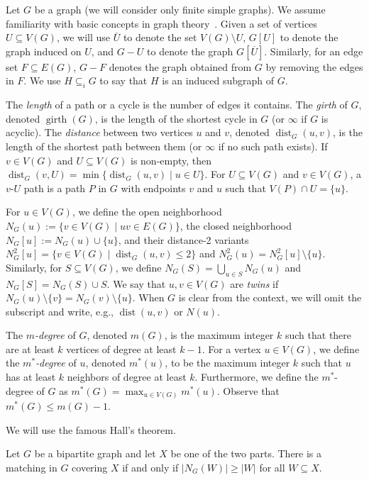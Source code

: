 \documentclass[runningheads, envcountsame]{llncs}
\newcommand{\sep}{\;|\;}
\newcommand{\seq}{\subseteq}
\DeclareMathOperator{\dist}{dist}
\DeclareMathOperator{\girth}{girth}
\begin{document}
Let $G$ be a graph (we will consider only finite simple graphs).
We assume familiarity with basic concepts in graph theory~\cite{Diestel}.
Given a set of vertices $U\seq V(G)$, we will use $\overline{U}$ to denote the set $V(G) \setminus U$, $G[U]$ to denote the graph induced on $U$, and $G - U$ to denote the graph $G[\overline{U}]$.
Similarly, for an edge set $F \seq E(G)$, $G-F$ denotes the graph obtained from $G$ by removing the edges in $F$.
We use $H \seq_i G$ to say that $H$ is an induced subgraph of $G$.

The \emph{length} of a path or a cycle is the number of edges it contains.
The \emph{girth} of $G$, denoted $\girth(G)$, is the length of the shortest cycle in $G$ (or $\infty$ if $G$ is acyclic).
The \emph{distance} between two vertices $u$ and $v$, denoted $\dist_G(u, v)$,
is the length of the shortest path between them (or $\infty$ if no such path exists).
If $v \in V(G)$ and $U \seq V(G)$ is non-empty, then $\dist_G(v, U) = \min\{\dist_G(u, v)\sep u \in U\}$.
For $U \seq V(G)$ and $v \in V(G)$, a $v$-$U$ path is a path $P$ in $G$ with endpoints $v$ and $u$ such that $V(P)\cap U = \{u\}$.

For $u\in V(G)$, we define the open neighborhood $N_G(u) := \{v \in V(G)\sep uv \in E(G)\}$, the closed neighborhood $N_G[u] := N_G(u) \cup \{u\}$, and their distance-2 variants $N^2_G[u] = \{v \in V(G)\sep \dist_G(u,v) \le 2\}$ and $N^2_G(u) = N^2_G[u] \setminus \{u\}$.
Similarly, for $S\seq V(G)$, we define $N_G(S) = \bigcup_{u \in S} N_G(u)$ and $N_G[S] = N_G(S) \cup S$.
We say that $u, v \in V(G)$ are \emph{twins} if $N_G(u) \setminus \{v\} = N_G(v) \setminus \{u\}$.
When $G$ is clear from the context, we will omit the subscript and write, e.g., $\dist(u, v)$ or $N(u)$.

The \emph{$m$-degree} of $G$, denoted $m(G)$, is the maximum integer $k$ such that there are at least $k$ vertices of degree at least $k-1$.
For a vertex $u \in V(G)$, we define the \emph{$m^*$-degree} of $u$, denoted $m^*(u)$, to be the maximum integer $k$ such that $u$ has at least $k$ neighbors of degree at least $k$.
Furthermore, we define the $m^*$-degree of $G$ as $m^*(G) = \max_{u \in V(G)} m^*(u)$.
Observe that $m^*(G) \le m(G) -1$.

We will use the famous Hall's theorem. 

\begin{theorem}\label{thm:Hall}
Let $G$ be a bipartite graph and let $X$ be one of the two parts.
There is a matching in $G$ covering $X$ if and only if $|N_G(W)| \ge |W|$ for all $W \seq X$.
\end{theorem}
\end{document}
